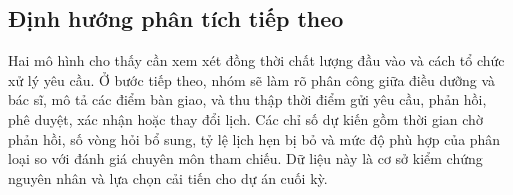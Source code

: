 \subsection{Định hướng phân tích tiếp theo}
\noindent Hai mô hình cho thấy cần xem xét đồng thời chất lượng đầu vào và cách tổ chức xử lý yêu cầu. Ở bước tiếp theo, nhóm sẽ làm rõ phân công giữa điều dưỡng và bác sĩ, mô tả các điểm bàn giao, và thu thập thời điểm gửi yêu cầu, phản hồi, phê duyệt, xác nhận hoặc thay đổi lịch. Các chỉ số dự kiến gồm thời gian chờ phản hồi, số vòng hỏi bổ sung, tỷ lệ lịch hẹn bị bỏ và mức độ phù hợp của phân loại so với đánh giá chuyên môn tham chiếu. Dữ liệu này là cơ sở kiểm chứng nguyên nhân và lựa chọn cải tiến cho dự án cuối kỳ.
